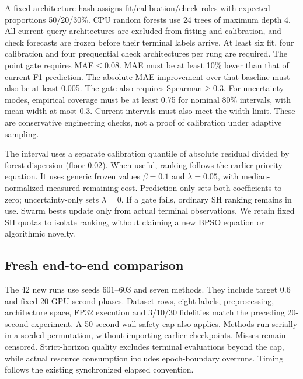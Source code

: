 A fixed architecture hash assigns fit/calibration/check roles with expected proportions 50/20/30\%. CPU random forests use 24 trees of maximum depth 4. All current query architectures are excluded from fitting and calibration, and check forecasts are frozen before their terminal labels arrive. At least six fit, four calibration and four prequential check architectures per rung are required. The point gate requires MAE$\leq0.08$. MAE must be at least 10\% lower than that of current-F1 prediction. The absolute MAE improvement over that baseline must also be at least 0.005. The gate also requires Spearman$\geq0.3$. For uncertainty modes, empirical coverage must be at least 0.75 for nominal 80\% intervals, with mean width at most 0.3. Current intervals must also meet the width limit. These are conservative engineering checks, not a proof of calibration under adaptive sampling.

The interval uses a separate calibration quantile of absolute residual divided by forest dispersion (floor 0.02). When useful, ranking follows the earlier priority equation. It uses generic frozen values $\beta=0.1$ and $\lambda=0.05$, with median-normalized measured remaining cost. Prediction-only sets both coefficients to zero; uncertainty-only sets $\lambda=0$. If a gate fails, ordinary SH ranking remains in use. Swarm bests update only from actual terminal observations. We retain fixed SH quotas to isolate ranking, without claiming a new BPSO equation or algorithmic novelty.

\subsection{Fresh end-to-end comparison}
The 42 new runs use seeds 601--603 and seven methods. They include target 0.6 and fixed 20-GPU-second phases. Dataset rows, eight labels, preprocessing, architecture space, FP32 execution and 3/10/30 fidelities match the preceding 20-second experiment. A 50-second wall safety cap also applies. Methods run serially in a seeded permutation, without importing earlier checkpoints. Misses remain censored. Strict-horizon quality excludes terminal evaluations beyond the cap, while actual resource consumption includes epoch-boundary overruns. Timing follows the existing synchronized elapsed convention.

